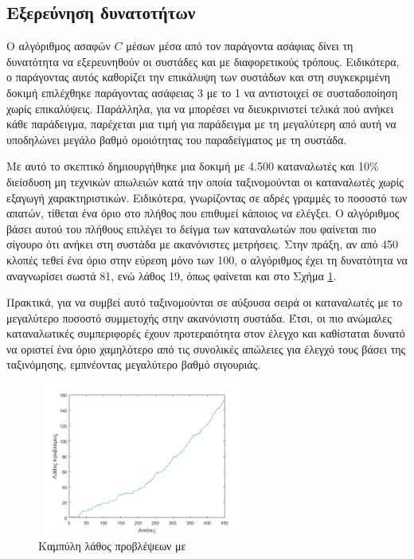 \subsection{Εξερεύνηση δυνατοτήτων }
Ο αλγόριθμος ασαφών $C$ μέσων μέσα από τον παράγοντα ασάφιας δίνει τη δυνατότητα να εξερευνηθούν οι συστάδες και με διαφορετικούς τρόπους. Ειδικότερα, ο παράγοντας αυτός καθορίζει την επικάλυψη των συστάδων και στη συγκεκριμένη δοκιμή επιλέχθηκε παράγοντας ασάφειας 3 με το 1 να αντιστοιχεί σε συσταδοποίηση χωρίς επικαλύψεις. Παράλληλα, για να μπορέσει να διευκρινιστεί τελικά πού ανήκει κάθε παράδειγμα, παρέχεται μια τιμή για παράδειγμα με τη μεγαλύτερη από αυτή να υποδηλώνει μεγάλο βαθμό ομοιότητας του παραδείγματος με τη συστάδα.\par
Με αυτό το σκεπτικό δημιουργήθηκε μια δοκιμή με 4.500 καταναλωτές και 10\% διείσδυση μη τεχνικών απωλειών κατά την οποία ταξινομούνται οι καταναλωτές χωρίς εξαγωγή χαρακτηριστικών. Ειδικότερα, γνωρίζοντας σε αδρές γραμμές το ποσοστό των απατών, τίθεται ένα όριο στο πλήθος που επιθυμεί κάποιος να ελέγξει. Ο αλγόριθμος βάσει αυτού του πλήθους επιλέγει το δείγμα των καταναλωτών που φαίνεται πιο σίγουρο ότι ανήκει στη συστάδα με ακανόνιστες μετρήσεις. Στην πράξη, αν από 450 κλοπές τεθεί ένα όριο στην εύρεση μόνο των 100, ο αλγόριθμος έχει τη δυνατότητα να αναγνωρίσει σωστά 81, ενώ λάθος 19, όπως φαίνεται και στο Σχήμα \ref{fig:wrongpredFCM}.\par
Πρακτικά, για να συμβεί αυτό ταξινομούνται σε αύξουσα σειρά οι καταναλωτές με το μεγαλύτερο ποσοστό συμμετοχής στην ακανόνιστη συστάδα. Έτσι, οι πιο ανώμαλες καταναλωτικές συμπεριφορές έχουν προτεραιότητα στον έλεγχο και καθίσταται δυνατό να οριστεί ένα όριο χαμηλότερο από τις συνολικές απώλειες για έλεγχό τους βάσει της ταξινόμησης, εμπνέοντας μεγαλύτερο βαθμό σιγουριάς.\par
\begin{figure}[ht!]
\centering
 \includegraphics[width=70mm, height=50mm]{../../plots/confident_predictions.png}
\caption{Καμπύλη λάθος προβλέψεων με }
\label{fig:wrongpredFCM}
\end{figure}
\newpage

